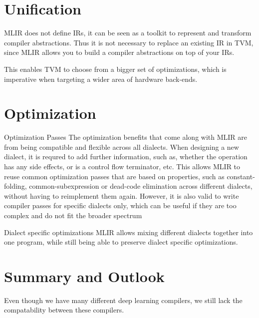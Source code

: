 \section{Unification}

MLIR does not define IRs, it can be seen as a toolkit to represent and transform compiler abstractions.
Thus it is not necessary to replace an existing IR in TVM, since MLIR allows you to build a compiler 
abstractions on top of your IRs. 


This enables TVM to choose from a bigger set of optimizations, which is imperative when targeting 
a wider area of hardware back-ends.

\section{Optimization}

Optimization Passes
The optimization benefits that come along with MLIR are from being compatible and 
flexible across all dialects. When designing a new dialect, it is requred to add 
further information, such as, whether the operation has any side effects, or is a control 
flow terminator, etc. This allows MLIR to reuse common optimization passes that are 
based on properties, such as constant-folding, common-subexpression or 
dead-code elimination across different dialects, without having to reimplement them again.
However, it is also valid to write compiler passes for specific dialects only, which can be 
useful if they are too complex and do not fit the broader spectrum

Dialect specific optimizations 
MLIR allows mixing different dialects together into one program, while still being able 
to preserve dialect specific optimizations. 
\section{Summary and Outlook}

Even though we have many different deep learning compilers, we still lack the compatability
between these compilers. 


